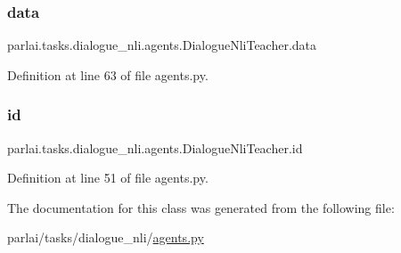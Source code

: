 \subsubsection{\texorpdfstring{data}{data}}
{\footnotesize\ttfamily parlai.\+tasks.\+dialogue\+\_\+nli.\+agents.\+Dialogue\+Nli\+Teacher.\+data}



Definition at line 63 of file agents.\+py.

\mbox{\label{classparlai_1_1tasks_1_1dialogue__nli_1_1agents_1_1DialogueNliTeacher_aec219032386350b637684f9ab46a09ab}} 
\subsubsection{\texorpdfstring{id}{id}}
{\footnotesize\ttfamily parlai.\+tasks.\+dialogue\+\_\+nli.\+agents.\+Dialogue\+Nli\+Teacher.\+id}



Definition at line 51 of file agents.\+py.



The documentation for this class was generated from the following file\+:\begin{DoxyCompactItemize}
\item 
parlai/tasks/dialogue\+\_\+nli/\hyperlink{parlai_2tasks_2dialogue__nli_2agents_8py}{agents.\+py}\end{DoxyCompactItemize}
